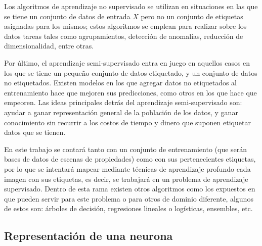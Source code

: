   Los algoritmos de aprendizaje no supervisado se utilizan en situaciones en las que se tiene un conjunto de datos de entrada \(X\) pero no un conjunto de etiquetas asignadas para los mismos; estos algoritmos se emplean para realizar sobre los datos tareas tales como agrupamientos, detección de anomalías, reducción de dimensionalidad, entre otras.
  
  Por último, el aprendizaje semi-supervisado entra en juego en aquellos casos en los que se tiene un pequeño conjunto de datos etiquetado, y un conjunto de datos no etiquetados. Existen modelos en los que agregar datos no etiquetados al entrenamiento hace que mejoren sus predicciones, como otros en los que hace que empeoren. Las ideas principales detrás del aprendizaje semi-supervisado son: ayudar a ganar representación general de la población de los datos, y ganar conocimiento sin recurrir a los costos de tiempo y dinero que suponen etiquetar datos que se tienen.
 
 En este trabajo se contará tanto con un conjunto de entrenamiento (que serán bases de datos de escenas de propiedades) como con sus pertenecientes etiquetas, por lo que se intentará mapear mediante técnicas de aprendizaje profundo cada imagen con sus etiquetas, es decir, se trabajará en un problema de aprendizaje supervisado. Dentro de esta rama existen otros algoritmos como los expuestos en \cite{scikit-learn} que pueden servir para este problema o para otros de dominio diferente, algunos de estos son: árboles de decisión, regresiones lineales o logísticas, ensembles, etc.
 
\subsection{Representación de una neurona}

